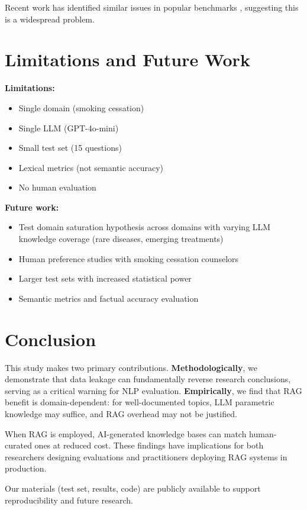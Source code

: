 \documentclass[11pt]{article}
\begin{document}
Recent work has identified similar issues in popular benchmarks \cite{lewis2021questionanswering, dodge2021documenting}, suggesting this is a widespread problem.

\section{Limitations and Future Work}

\textbf{Limitations:}
\begin{itemize}
    \item Single domain (smoking cessation)
    \item Single LLM (GPT-4o-mini)
    \item Small test set (15 questions)
    \item Lexical metrics (not semantic accuracy)
    \item No human evaluation
\end{itemize}

\textbf{Future work:}
\begin{itemize}
    \item Test domain saturation hypothesis across domains with varying LLM knowledge coverage (rare diseases, emerging treatments)
    \item Human preference studies with smoking cessation counselors
    \item Larger test sets with increased statistical power
    \item Semantic metrics and factual accuracy evaluation
\end{itemize}

\section{Conclusion}

This study makes two primary contributions. \textbf{Methodologically}, we demonstrate that data leakage can fundamentally reverse research conclusions, serving as a critical warning for NLP evaluation. \textbf{Empirically}, we find that RAG benefit is domain-dependent: for well-documented topics, LLM parametric knowledge may suffice, and RAG overhead may not be justified.

When RAG is employed, AI-generated knowledge bases can match human-curated ones at reduced cost. These findings have implications for both researchers designing evaluations and practitioners deploying RAG systems in production.

Our materials (test set, results, code) are publicly available to support reproducibility and future research.
\end{document}
